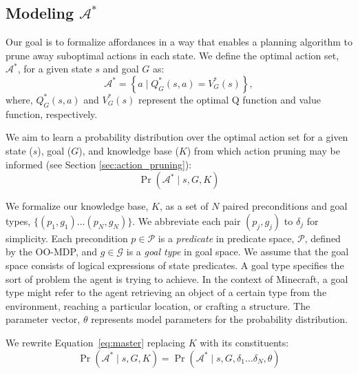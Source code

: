 \documentclass[letterpaper]{article}
\begin{document}
\subsection{Modeling $\mathcal{A}^*$}


Our goal is to formalize affordances in a way that enables a planning
algorithm to prune away suboptimal actions in each state. We define
the optimal action set, $\mathcal{A}^*$, for a given state $s$ and
goal $G$ as:
\begin{equation}
\mathcal{A}^* = \left\{ a \mid Q^*_G(s,a) = V^*_G(s) \right\}, 
\label{eq:opt_act_set}
\end{equation}
where, $Q^*_G(s,a)$ and $V^*_G(s)$ represent the optimal Q function and 
value function, respectively. 

We aim to learn a probability distribution over the optimal action set
for a given state ($s$), goal ($G$), and knowledge base ($K$) from
which action pruning may be informed (see Section
\ref{sec:action_pruning}):
\begin{equation}
\Pr(\mathcal{A}^* \mid s, G, K)
\label{eq:master}
\end{equation}

We formalize our knowledge base, $K$, as a set of $N$ paired preconditions and goal types, $\{ (p_1, g_1) 
\ldots (p_{N}, g_{N}) \}$. We abbreviate each pair $(p_j, g_j)$ to $\delta_j$ for simplicity. Each precondition $p \in \mathcal{P}$
is a {\it predicate} in predicate space, $\mathcal{P}$, defined by the OO-MDP, and
$g \in \mathcal{G}$ is a {\it goal type} in goal space. We assume that the goal space
consists of logical expressions of state predicates. A goal type specifies the sort of
problem the agent is trying to achieve. In the context of Minecraft, a goal type might refer
to the agent retrieving an object of a certain type from the environment, reaching a particular
location, or crafting a structure. The parameter vector, $\theta$ represents model parameters for the probability distribution.

We rewrite Equation~\ref{eq:master} replacing $K$ with its constituents:
\begin{equation}
\Pr(\mathcal{A}^* \mid s, G, K) = \Pr(\mathcal{A}^* \mid s, G, \delta_1 \ldots \delta_{N}, \theta)
\end{equation}
\end{document}
